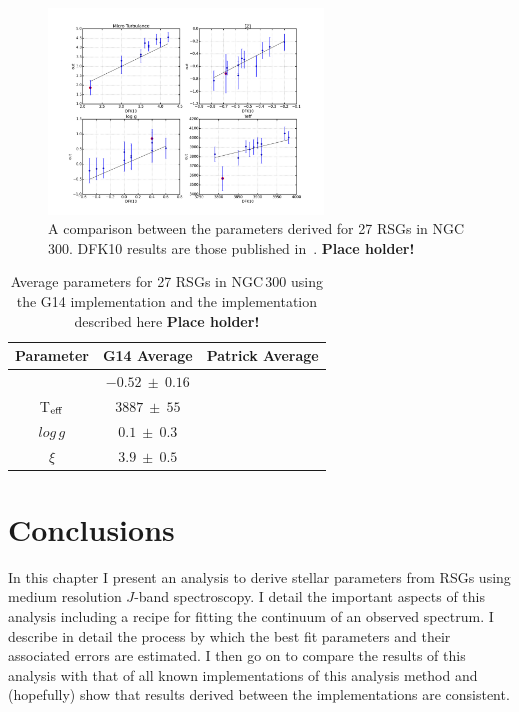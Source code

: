 \begin{figure}
 \centering
 \includegraphics[width=0.65\textwidth]{JAnal/compare-DFK10}
 \caption[NGC\,300 G14]{
A comparison between the parameters derived for 27 RSGs in NGC\,300.
DFK10 results are those published in~\cite{2015ApJ...805..182G}.
\textbf{Place holder!}\label{fig:n300G14}
         }
\end{figure}

\begin{table}
\caption[Parameter comparisons G14]{Average parameters for 27 RSGs in NGC\,300 using the G14 implementation and the implementation described here
\textbf{Place holder!}\label{tb:G14}}
\scriptsize
\begin{center}
\begin{tabular}{ccc}
 \hline
 \hline
Parameter & G14 Average & Patrick Average \\
 \hline
[Z]       & $-0.52~\pm~0.16$ &  \\
T$_{\rm eff}$ & $3887~\pm~55$ &  \\
$log\,g$  & $0.1~\pm~0.3$ &  \\
$\xi$     & $3.9~\pm~0.5$ &  \\
 \hline
\end{tabular}
\end{center}
\end{table}

\section{Conclusions} %
\label{sub:conclusions}
In this chapter I present an analysis to derive stellar parameters from RSGs using medium resolution $J$-band spectroscopy.
I detail the important aspects of this analysis including a recipe for fitting the continuum of an observed spectrum.
I describe in detail the process by which the best fit parameters and their associated errors are estimated.
I then go on to compare the results of this analysis with that of all known implementations of this analysis method and (hopefully) show that results derived between the implementations are consistent.

